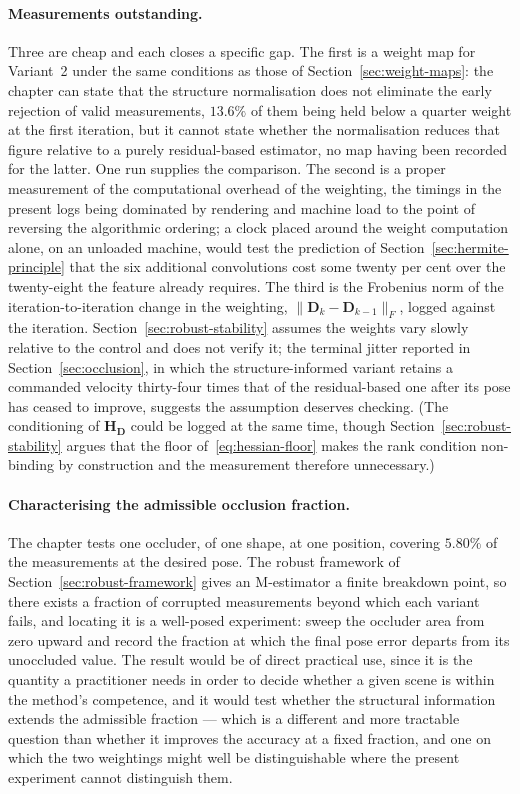 \paragraph{Measurements outstanding.}
Three are cheap and each closes a specific gap. The first is a weight map for
Variant~2 under the same conditions as those of
Section~\ref{sec:weight-maps}: the chapter can state that the structure
normalisation does not eliminate the early rejection of valid measurements,
$13.6\%$ of them being held below a quarter weight at the first iteration, but
it cannot state whether the normalisation reduces that figure relative to a
purely residual-based estimator, no map having been recorded for the latter.
One run supplies the comparison. The second is a proper measurement of the
computational overhead of the weighting, the timings in the present logs being
dominated by rendering and machine load to the point of reversing the
algorithmic ordering; a clock placed around the weight computation alone, on
an unloaded machine, would test the prediction of
Section~\ref{sec:hermite-principle} that the six additional convolutions cost
some twenty per cent over the twenty-eight the feature already requires. The
third is the Frobenius norm of the iteration-to-iteration change in the
weighting, $\lVert\mathbf{D}_{k}-\mathbf{D}_{k-1}\rVert_{F}$, logged against
the iteration. Section~\ref{sec:robust-stability} assumes the weights vary
slowly relative to the control and does not verify it; the terminal jitter
reported in Section~\ref{sec:occlusion}, in which the structure-informed
variant retains a commanded velocity thirty-four times that of the
residual-based one after its pose has ceased to improve, suggests the
assumption deserves checking. (The conditioning of
$\mathbf{H}_{\mathbf{D}}$ could be logged at the same time, though
Section~\ref{sec:robust-stability} argues that the floor
of~\eqref{eq:hessian-floor} makes the rank condition non-binding by
construction and the measurement therefore unnecessary.)

\paragraph{Characterising the admissible occlusion fraction.}
The chapter tests one occluder, of one shape, at one position, covering
$5.80\%$ of the measurements at the desired pose. The robust framework of
Section~\ref{sec:robust-framework} gives an M-estimator a finite breakdown
point, so there exists a fraction of corrupted measurements beyond which each
variant fails, and locating it is a well-posed experiment: sweep the occluder
area from zero upward and record the fraction at which the final pose error
departs from its unoccluded value. The result would be of direct practical
use, since it is the quantity a practitioner needs in order to decide whether
a given scene is within the method's competence, and it would test whether the
structural information extends the admissible fraction --- which is a
different and more tractable question than whether it improves the accuracy at
a fixed fraction, and one on which the two weightings might well be
distinguishable where the present experiment cannot distinguish them.

